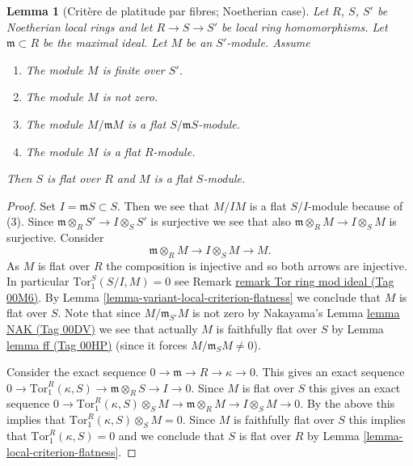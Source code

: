 \documentclass{amsart}
\theoremstyle{plain}
\newtheorem{lemma}[subsection]{Lemma}
\theoremstyle{definition}
\theoremstyle{remark}
\numberwithin{equation}{subsection}
\begin{document}
\begin{lemma}[Crit\`ere de platitude par fibres; Noetherian case]
\label{lemma-criterion-flatness-fibre-Noetherian}
Let $R$, $S$, $S'$ be Noetherian local rings and let $R \to S \to S'$
be local ring homomorphisms. Let $\mathfrak m \subset R$ be the
maximal ideal. Let $M$ be an $S'$-module. Assume
\begin{enumerate}
\item The module $M$ is finite over $S'$.
\item The module $M$ is not zero.
\item The module $M/\mathfrak m M$
is a flat $S/\mathfrak m S$-module.
\item The module $M$ is a flat $R$-module.
\end{enumerate}
Then $S$ is flat over $R$ and $M$ is a flat $S$-module.
\end{lemma}

\begin{proof}
Set $I = \mathfrak mS \subset S$. Then we see that $M/IM$ is a flat
$S/I$-module because of (3). Since
$\mathfrak m \otimes_R S' \to I \otimes_S S'$ is surjective we see
that also $\mathfrak m \otimes_R M \to I \otimes_S M$ is surjective.
Consider
$$
\mathfrak m \otimes_R M \to I \otimes_S M \to M.
$$
As $M$ is flat over $R$ the composition is injective
and so both arrows are injective.
In particular $\text{Tor}_1^S(S/I, M) = 0$ see
Remark \href{https://stacks.math.columbia.edu/tag/00M6}{remark Tor ring mod ideal (Tag 00M6)}. By
Lemma \ref{lemma-variant-local-criterion-flatness} we conclude
that $M$ is flat over $S$. Note that since $M/\mathfrak m_{S'}M$
is not zero by Nakayama's Lemma \href{https://stacks.math.columbia.edu/tag/00DV}{lemma NAK (Tag 00DV)}
we see that actually $M$ is faithfully flat over $S$ by
Lemma \href{https://stacks.math.columbia.edu/tag/00HP}{lemma ff (Tag 00HP)} (since it forces $M/\mathfrak m_SM \not = 0$).

\medskip\noindent
Consider the exact sequence
$0 \to \mathfrak m \to R \to \kappa \to 0$.
This gives an exact sequence
$0 \to \text{Tor}_1^R(\kappa, S) \to \mathfrak m \otimes_R S \to I \to 0$.
Since $M$ is flat over $S$ this gives an exact sequence
$0 \to \text{Tor}_1^R(\kappa, S)\otimes_S M \to
\mathfrak m \otimes_R M \to I \otimes_S M \to 0$.
By the above this implies that $\text{Tor}_1^R(\kappa, S)\otimes_S M = 0$.
Since $M$ is faithfully flat over $S$ this implies that
$\text{Tor}_1^R(\kappa, S) = 0$ and we conclude that
$S$ is flat over $R$ by Lemma \ref{lemma-local-criterion-flatness}.
\end{proof}
\end{document}

